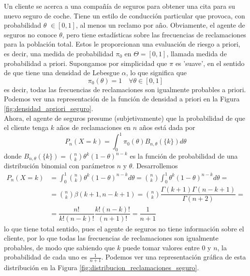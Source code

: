 \begin{ejemplo}
    Un cliente se acerca a una compañía de seguros para obtener una cita para su nuevo seguro de coche. Tiene un estilo de conducción particular que provoca, con probabilidad $\theta$ $\in [0,1]$, al menos un reclamo por año. Obviamente, el agente de seguros no conoce $\theta$, pero tiene estadísticas sobre las frecuencias de reclamaciones para la población total. Estos le proporcionan una evaluación de riesgo a priori, es decir, una medida de probabilidad $\pi_0$ en $\Theta = [0,1]$, llamada medida de probabilidad a priori. Supongamos por simplicidad que $\pi$ es 'suave', en el sentido de que tiene una densidad de Lebesgue $\alpha$, lo que significa que 
    \begin{equation*}
        \pi_0(\theta)=1 \quad \forall \theta \in [0,1]
    \end{equation*}
    es decir, todas las frecuencias de reclamaciones son igualmente probables a priori. Podemos ver una representación de la función de densidad a priori en la Figura \ref{fig:densidad_apriori_seguro}. \\
    \noindent
    Ahora, el agente de seguros presume (subjetivamente) que la probabilidad de que el cliente tenga $k$ años de reclamaciones en $n$ años está dada por
    \begin{equation*}
        P_n(X=k)=\int_{0}^{1} \pi_0(\theta) B_{n,\theta}(\{k\}) d\theta
    \end{equation*}
    donde $B_{n,\theta}(\{k\})=\binom{n}{k} \theta^k (1-\theta)^{n-k}$ es la función de probabilidad de una distribución binomial con parámetros $n$ y $\theta$. Desarrollemos
    \begin{align*}
        P_n(X=k) &= \int_{0}^{1} \binom{n}{k} \theta^k (1-\theta)^{n-k} d\theta = \binom{n}{k} \int_{0}^{1} \theta^k (1-\theta)^{n-k} d\theta = \\
        &= \binom{n}{k} \beta(k+1, n-k+1) = \binom{n}{k} \dfrac{\Gamma(k+1)\Gamma(n-k+1)}{\Gamma(n+2)} = \\
        &= \dfrac{n!}{k!(n-k)!} \dfrac{k!(n-k)!}{(n+1)!} = \dfrac{1}{n+1}
    \end{align*}
    lo que tiene total sentido, pues el agente de seguros no tiene información sobre el cliente, por lo que todas las frecuencias de reclamaciones son igualmente probables, de modo que sabiendo que $k$ puede tomar valores entre $0$ y $n$, la probabilidad de cada uno es $\frac{1}{n+1}$. Podemos ver una representación gráfica de esta distribución en la Figura \ref{fig:distribucion_reclamaciones_seguro}. \\

\end{ejemplo}
